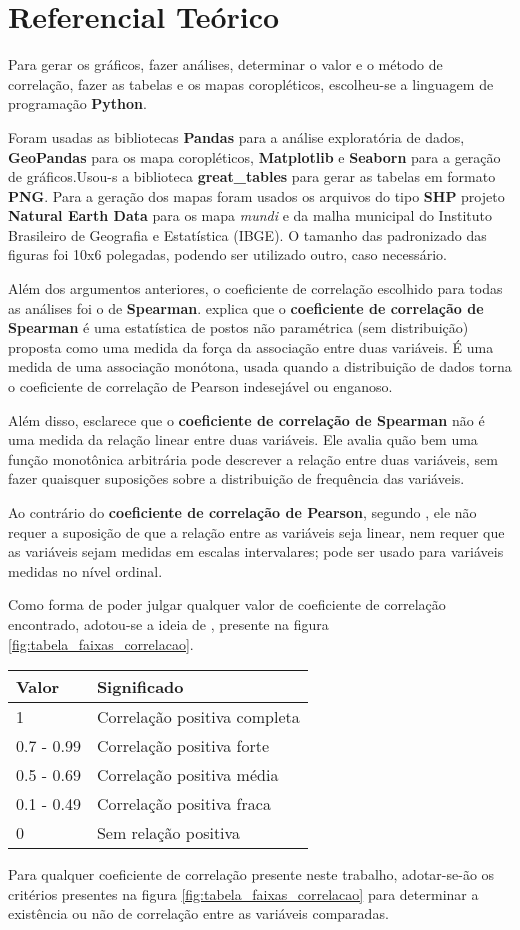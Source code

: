 \chapter{Referencial Teórico}

Para gerar os gráficos, fazer análises, determinar o valor e o método de correlação, fazer as tabelas e os mapas coropléticos, escolheu-se a linguagem de programação \textbf{Python}.

Foram usadas as bibliotecas \textbf{Pandas} para a análise exploratória de dados, \textbf{GeoPandas} para os mapa coropléticos, \textbf{Matplotlib} e \textbf{Seaborn} para a geração  de gráficos.Usou-s a biblioteca \textbf{great\_tables} para gerar as tabelas em formato \textbf{PNG}. Para a geração dos mapas foram usados os arquivos do tipo \textbf{SHP} projeto \textbf{Natural Earth Data} para os mapa \textit{mundi} e da malha municipal do Instituto Brasileiro de Geografia e Estatística (IBGE). O tamanho das padronizado das figuras foi 10x6 polegadas, podendo ser utilizado outro, caso necessário.

Além dos argumentos anteriores, o coeficiente de correlação escolhido para todas as análises foi o de \textbf{Spearman}. \cite{hauke2011comparison} explica que o \textbf{coeficiente de correlação de Spearman} é uma estatística de postos não paramétrica (sem distribuição) proposta como uma medida da força da associação entre duas variáveis. É uma medida de uma associação monótona, usada quando a distribuição de dados torna o coeficiente de correlação de Pearson indesejável ou enganoso. 

Além disso, \cite{hauke2011comparison} esclarece que o \textbf{coeficiente de correlação de Spearman} não é uma medida da relação linear entre duas variáveis. Ele avalia quão bem uma função monotônica arbitrária pode descrever a relação entre duas variáveis, sem fazer quaisquer suposições sobre a distribuição de frequência das variáveis.

Ao contrário do \textbf{coeficiente de correlação de Pearson}, segundo \cite{hauke2011comparison}, ele não requer a suposição de que a relação entre as variáveis seja linear, nem requer que as variáveis sejam medidas em escalas intervalares; pode ser usado para variáveis medidas no nível ordinal.

Como forma de poder julgar qualquer valor de coeficiente de correlação encontrado, adotou-se a ideia de \cite{ali2022spearman}, presente na figura \ref{fig:tabela_faixas_correlacao}.

\begin{table}[]
\begin{tabular}{@{}ll@{}}
\toprule
Valor      & Significado                  \\ \midrule
1          & Correlação positiva completa \\
0.7 - 0.99 & Correlação positiva forte    \\
0.5 - 0.69 & Correlação positiva média    \\ \midrule
0.1 - 0.49 & Correlação positiva fraca    \\
0          & Sem relação positiva        
\end{tabular}
\end{table}

Para qualquer coeficiente de correlação presente neste trabalho, adotar-se-ão os critérios presentes na figura \ref{fig:tabela_faixas_correlacao} para determinar a existência ou não de correlação entre as variáveis comparadas.